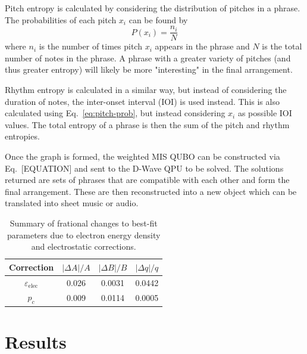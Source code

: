 \documentclass[aps,pra,10pt,twocolumn]{revtex4-2}
\begin{document}
Pitch entropy is calculated by considering the distribution of pitches in a phrase. The probabilities of each pitch $x_i$ can be found by
\begin{equation}
    P(x_i)=\frac{n_i}{N}
    \label{eq:pitch-prob}
\end{equation}
where $n_i$ is the number of times pitch $x_i$ appears in the phrase and $N$ is the total number of notes in the phrase. A phrase with a greater variety of pitches (and thus greater entropy) will likely be more "interesting" in the final arrangement.

Rhythm entropy is calculated in a similar way, but instead of considering the duration of notes, the inter-onset interval (IOI) is used instead. This is also calculated using Eq.\ \ref{eq:pitch-prob}, but instead considering $x_i$ as possible IOI values.
The total entropy of a phrase is then the sum of the pitch and rhythm entropies.

Once the graph is formed, the weighted MIS QUBO can be constructed via Eq.\ [EQUATION] and sent to the D-Wave QPU to be solved. The solutions returned are sets of phrases that are compatible with each other and form the final arrangement. These are then reconstructed into a new object which can be translated into sheet music or audio.

\begin{table}[ht] %
    \caption{Summary of frational changes to best-fit parameters due to electron energy density and electrostatic corrections.}
    \label{tab:corrections}
    \setlength{\tabcolsep}{12pt} %
    \renewcommand{\arraystretch}{1.5}
    \begin{tabular}{c|c|c|c} %
        \toprule
        \textbf{Correction} & $|\Delta A|/A$ & $|\Delta B|/B$ & $|\Delta q|/q$\\
        \midrule
        $\varepsilon_\mathrm{elec}$ & 0.026 & 0.0031 & 0.0442 \\
        $p_c$ & 0.009 & 0.0114 & 0.0005 \\
        \bottomrule
    \end{tabular}
\end{table}

\newpage
\section{Results}
\end{document}
